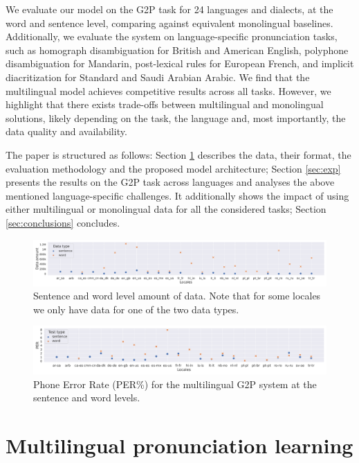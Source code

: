 We evaluate our model on the G2P task for 24 languages and dialects, at the word and sentence level, comparing against equivalent monolingual baselines.
Additionally, we evaluate the system on language-specific pronunciation tasks, such as homograph disambiguation for British and American English, polyphone disambiguation for Mandarin, post-lexical rules for European French, and implicit diacritization for Standard and Saudi Arabian Arabic. 
We find that the multilingual model achieves competitive results across all tasks. However, we highlight that there exists trade-offs between multilingual and monolingual solutions, likely depending on the task, the language and, most importantly, the data quality and availability. 


The paper is structured as follows: Section \ref{sec:g2p} describes the data, their format, the evaluation methodology and the proposed model architecture; Section \ref{sec:exp} presents the results on the G2P task across languages and analyses the above mentioned language-specific challenges. It additionally shows the impact of using either multilingual or monolingual data for all the considered tasks; Section \ref{sec:conclusions} concludes.


\begin{figure}[t]
  \centering
  \includegraphics[width=1.0\linewidth]{figures/multilingual_data_amount.pdf}
  \caption{Sentence and word level amount of data. Note that for some locales we only have data for one of the two data types.}
  \label{fig:amount}
\end{figure}


\begin{figure}[t]
  \centering
  \includegraphics[width=1.0\linewidth]{figures/multilingual_results.pdf}
  \caption{Phone Error Rate (PER\%) for the multilingual G2P system at the sentence and word levels.}
  \label{fig:all}
\end{figure}

\section{Multilingual pronunciation learning}
\label{sec:g2p}


